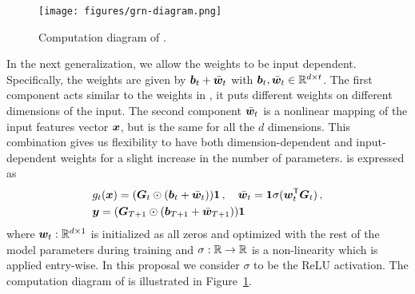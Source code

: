 
\begin{figure}[t!]
    \centering
    \texttt{[image: figures/grn-diagram.png]}
    \vskip -0.1in
    \caption{Computation diagram of \GenC{}.}
    \label{fig:grn-diagram}
\end{figure}

 In the next generalization, we allow the weights to be input dependent. Specifically, the weights are given by $\bm{b}_t+\bar{\bm{w}}_t$ with $\bm{b}_t,\bar{\bm{w}}_t\in\mathbb{R}^{d\times t}$. The first component acts similar to the weights in \GenB{}, it puts different weights on different dimensions of the input.  The second component  $\bar{\bm{w}}_t$ is a nonlinear mapping of the input features vector $\bm{x}$, but is the same for all the $d$ dimensions. This combination gives us flexibility to have both dimension-dependent and input-dependent weights for a slight increase in the number of parameters. \GenC{} is expressed as \begin{align*}
&g_t(\bm{x}) = ({\bm{G}}_t\odot(\bm{b}_t+ \bar{\bm{w}}_t)){\mathbf{1}}\,,\quad \bar{\bm{w}}_t ={\mathbf{1}}\sigma(\bm{w}_t^{\sf T}{\bm{G}}_t)\,,\\
&\bm{y} = ({\bm{G}}_{T+1}\odot(\bm{b}_{T+1}+ \bar{\bm{w}}_{T+1})){\mathbf{1}}
\end{align*}
where $\bm{w}_t:\mathbb{R}^{d\times 1}$ is initialized as all zeros and optimized with the rest of the model parameters during training and $\sigma:\mathbb{R}\to\mathbb{R}$ is a non-linearity which is applied entry-wise.
In this proposal we consider $\sigma$ to be the ReLU activation. The computation diagram of \GenC{} is illustrated in Figure~\ref{fig:grn-diagram}.




